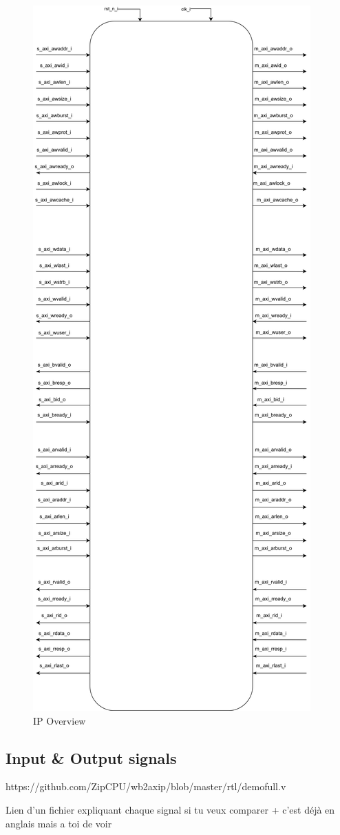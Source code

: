 \begin{figure}[H]
    \centering
    \includegraphics[width=0.55\linewidth]{images/Overview_Upsizer(1).png}
    \caption{IP Overview}
\end{figure}

\subsection{Input \& Output signals}

https://github.com/ZipCPU/wb2axip/blob/master/rtl/demofull.v

Lien d'un fichier expliquant chaque signal si tu veux comparer + c'est déjà en anglais mais a toi de voir

